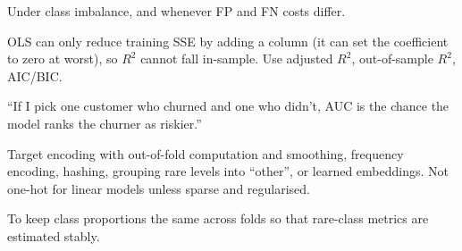 \A Under class imbalance, and whenever FP and FN costs differ.

\A OLS can only reduce training SSE by adding a column (it can set the coefficient to zero at worst), so $R^2$ cannot fall in-sample. Use adjusted $R^2$, out-of-sample $R^2$, AIC/BIC.

\A ``If I pick one customer who churned and one who didn't, AUC is the chance the model ranks the churner as riskier.''

\A Target encoding with out-of-fold computation and smoothing, frequency encoding, hashing, grouping rare levels into ``other'', or learned embeddings. Not one-hot for linear models unless sparse and regularised.

\A To keep class proportions the same across folds so that rare-class metrics are estimated stably.
